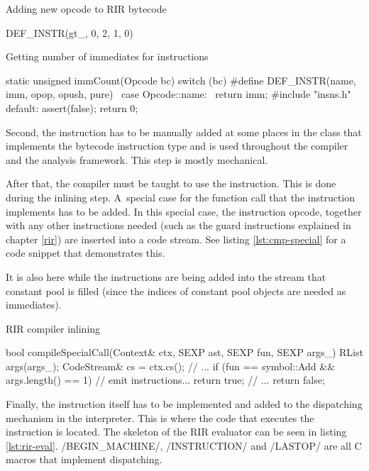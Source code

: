 \begin{listing}[htbp]
  \caption{\label{lst:def-instr}Adding new opcode to RIR bytecode}
  \begin{ccode}
DEF_INSTR(gt_, 0, 2, 1, 0)
  \end{ccode}
\end{listing}

\begin{listing}[htbp]
  \caption{\label{lst:imm}Getting number of immediates for instructions}
  \begin{cppcode}
static unsigned immCount(Opcode bc) {
    switch (bc) {
#define DEF_INSTR(name, imm, opop, opush, pure)                       \
    case Opcode::name:                                                \
        return imm;
#include "insns.h"
    default:
        assert(false);
        return 0;
    }
}
  \end{cppcode}
\end{listing}

Second, the instruction has to be manually added at some places in the class that implements the bytecode instruction type and is used throughout the compiler and the analysis framework. This step is mostly mechanical.

After that, the compiler must be taught to use the instruction. This is done during the inlining step. A~special case for the function call that the instruction implements has to be added. In this special case, the instruction opcode, together with any other instructions needed (such as the guard instructions explained in chapter \ref{rir}) are inserted into a code stream. See listing \ref{lst:cmp-special} for a code snippet that demonstrates this.

It is also here while the instructions are being added into the stream that constant pool is filled (since the indices of constant pool objects are needed as immediates).

\begin{listing}[htbp]
  \caption{\label{lst:cmp-special}RIR compiler inlining}
  \begin{cppcode}
bool compileSpecialCall(Context& ctx, SEXP ast, SEXP fun, SEXP args_) {
    RList args(args_);
    CodeStream& cs = ctx.cs();
    // ...
    if (fun == symbol::Add && args.length() == 1) {
        // emit instructions...
        return true;
    }
    // ...
    return false;
}
  \end{cppcode}
\end{listing}

Finally, the instruction itself has to be implemented and added to the dispatching mechanism in the interpreter. This is where the code that executes the instruction is located. The skeleton of the RIR evaluator can be seen in listing \ref{lst:rir-eval}. \cinline/BEGIN_MACHINE/, \cinline/INSTRUCTION/ and \cinline/LASTOP/ are all C macros that implement dispatching.

